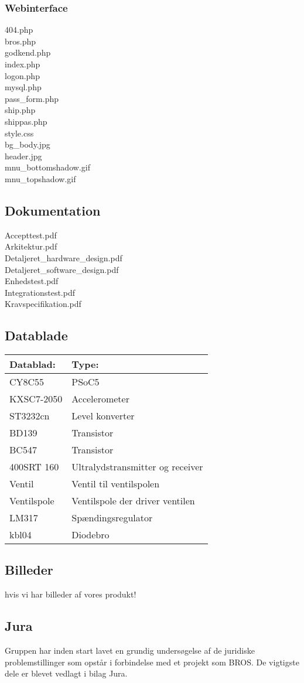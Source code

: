 \subsubsection*{Webinterface}
404.php\\
bros.php\\
godkend.php\\
index.php\\
logon.php\\
mysql.php\\
pass\_form.php\\
ship.php\\
shippas.php\\
style.css\\
bg\_body.jpg\\
header.jpg\\
mnu\_bottomshadow.gif\\
mnu\_topshadow.gif\\


\subsection{Dokumentation}
Accepttest.pdf\\
Arkitektur.pdf\\
Detaljeret\_hardware\_design.pdf\\
Detaljeret\_software\_design.pdf\\
Enhedstest.pdf\\
Integrationstest.pdf\\
Kravspecifikation.pdf\\

\subsection{Datablade}
\begin{table}[H]
\begin{tabular}{ll}
\textbf{Datablad:}& \textbf{Type:} \\\hline
CY8C55\phantom{mmmmmm} & PSoC5 \\
KXSC7-2050& Accelerometer\\
ST3232cn & Level konverter \\
BD139 & Transistor \\
BC547 & Transistor \\
400SRT 160 & Ultralydstransmitter og receiver \\
Ventil & Ventil til ventilspolen \\
Ventilspole & Ventilspole der driver ventilen \\
LM317 & Spændingsregulator \\
kbl04 & Diodebro \\

\end{tabular}
\end{table}


\subsection{Billeder}
hvis vi har billeder af vores produkt!\\

\subsection{Jura}
Gruppen har inden start lavet en grundig undersøgelse af de juridiske problemstillinger som opstår i forbindelse med et projekt som BROS. De vigtigste dele er blevet vedlagt i bilag Jura.